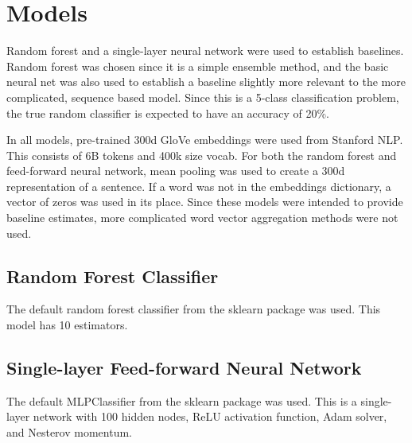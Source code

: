     
\section{Models}
Random forest and a single-layer neural network were used to establish baselines. Random forest was chosen since it is a simple ensemble method, and the basic neural net was also used to establish a baseline slightly more relevant to the more complicated, sequence based model. Since this is a 5-class classification problem, the true random classifier is expected to have an accuracy of 20\%.  
\par 
In all models, pre-trained 300d GloVe embeddings were used from Stanford NLP. This consists of 6B tokens and 400k size vocab. For both the random forest and feed-forward neural network, mean pooling was used to create a 300d representation of a sentence. If a word was not in the embeddings dictionary, a vector of zeros was used in its place. Since these models were intended to provide baseline estimates, more complicated word vector aggregation methods were not used.
\subsection{Random Forest Classifier}
The default random forest classifier from the sklearn package was used. This model has 10 estimators. 
\subsection{Single-layer Feed-forward Neural Network}
The default MLPClassifier from the sklearn package was used. This is a single-layer network with 100 hidden nodes, ReLU activation function, Adam solver, and Nesterov momentum. 
